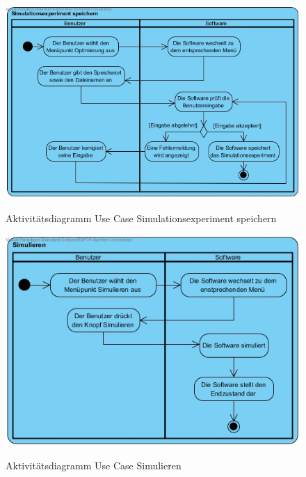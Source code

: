 \begin{figure}[H]
	\centering
	\includegraphics[scale=.5]{Bilder/Simulationsexperiment_speichern.jpg}\\
	\caption{Aktivitätsdiagramm Use Case Simulationsexperiment speichern}
	\label{Aktivitätsdiagramm Use Case Simulationsexperiment speichern}
\end{figure}

\begin{figure}[H]
	\centering
	\includegraphics[scale=.5]{Bilder/Simulieren.jpg}\\
	\caption{Aktivitätsdiagramm Use Case Simulieren}
	\label{Aktivitätsdiagramm Use Case Simulieren}
\end{figure}

